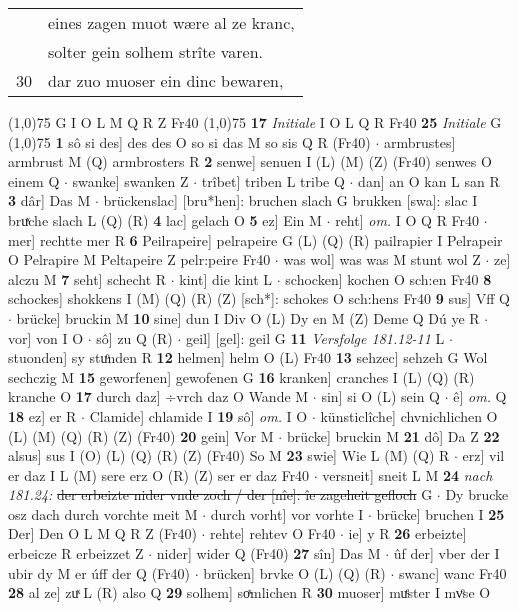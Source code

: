\documentclass[8pt,a4paper,notitlepage]{article}
\begin{document}
\begin{table}[ht]
\begin{minipage}[t]{0.5\linewidth}
\begin{tabular}{rl}
 & eines zagen muot wære al ze kranc,\\ 
 & solter gein solhem strîte varen.\\ 
30 & dar zuo muoser ein dinc bewaren,\\ 
\end{tabular}
\scriptsize
\line(1,0){75} \newline
G I O L M Q R Z Fr40 \newline
\line(1,0){75} \newline
\textbf{17} \textit{Initiale} I O L Q R Fr40  \textbf{25} \textit{Initiale} G  \newline
\line(1,0){75} \newline
\textbf{1} sô si des] des des O so si das M so sis Q R (Fr40)  $\cdot$ armbrustes] armbrust M (Q) armbrosters R \textbf{2} senwe] senuen I (L) (M) (Z) (Fr40) senwes O einem Q  $\cdot$ swanke] swanken Z  $\cdot$ trîbet] triben L tribe Q  $\cdot$ dan] an O kan L san R \textbf{3} dâr] Das M  $\cdot$ brückenslac] [bru*hen]: bruchen slach G brukken [swa]: slac I bruͯche slach L (Q) (R) \textbf{4} lac] gelach O \textbf{5} ez] Ein M  $\cdot$ reht] \textit{om.} I O Q R Fr40  $\cdot$ mer] rechtte mer R \textbf{6} Peilrapeire] pelrapeire G (L) (Q) (R) pailrapier I Pelrapeir O Pelrapire M Peltapeire Z pelr:peire Fr40  $\cdot$ was wol] was was M stunt wol Z  $\cdot$ ze] alczu M \textbf{7} seht] schecht R  $\cdot$ kint] die kint L  $\cdot$ schocken] kochen O sch:en Fr40 \textbf{8} schockes] shokkens I (M) (Q) (R) (Z) [sch*]: schokes  O sch:hens Fr40 \textbf{9} sus] Vff Q  $\cdot$ brücke] bruckin M \textbf{10} sine] dun I Div O (L) Dy en M (Z) Deme Q Dú ye R  $\cdot$ vor] von I O  $\cdot$ sô] zu Q (R)  $\cdot$ geil] [gel]: geil G \textbf{11} \textit{Versfolge 181.12-11} L   $\cdot$ stuonden] sy stuͦnden R \textbf{12} helmen] helm O (L) Fr40 \textbf{13} sehzec] sehzeh G Wol sechczig M \textbf{15} geworfenen] gewofenen G \textbf{16} kranken] cranches I (L) (Q) (R) kranche O \textbf{17} durch daz] ÷vrch daz O Wande M  $\cdot$ sin] si O (L) sein Q  $\cdot$ ê] \textit{om.} Q \textbf{18} ez] er R  $\cdot$ Clamide] chlamide I \textbf{19} sô] \textit{om.} I O  $\cdot$ künsticlîche] chvnichlichen O (L) (M) (Q) (R) (Z) (Fr40) \textbf{20} gein] Vor M  $\cdot$ brücke] bruckin M \textbf{21} dô] Da Z \textbf{22} alsus] sus I (O) (L) (Q) (R) (Z) (Fr40) So M \textbf{23} swie] Wie L (M) (Q) R  $\cdot$ erz] vil er daz I L (M) sere erz O (R) (Z) ser er daz Fr40  $\cdot$ versneit] sneit L M \textbf{24} \textit{nach 181.24:} \sout{der erbeizte nider vnde zoch / der [nîe]: îe zageheit gefloch} G   $\cdot$ Dy brucke osz dach durch vorchte meit M  $\cdot$ durch vorht] vor vorhte I  $\cdot$ brücke] bruchen I \textbf{25} Der] Den O L M Q R Z (Fr40)  $\cdot$ rehte] rehtev O Fr40  $\cdot$ ie] y R \textbf{26} erbeizte] erbeicze R erbeizzet Z  $\cdot$ nider] wider Q (Fr40) \textbf{27} sîn] Das M  $\cdot$ ûf der] vber der I ubir dy M er úff der Q (Fr40)  $\cdot$ brücken] brvke O (L) (Q) (R)  $\cdot$ swanc] wanc Fr40 \textbf{28} al ze] zuͯ L (R) also Q \textbf{29} solhem] soͯmlichen R \textbf{30} muoser] muͤster I mvͦse O \newline

\end{minipage}
\end{table}
\end{document}
